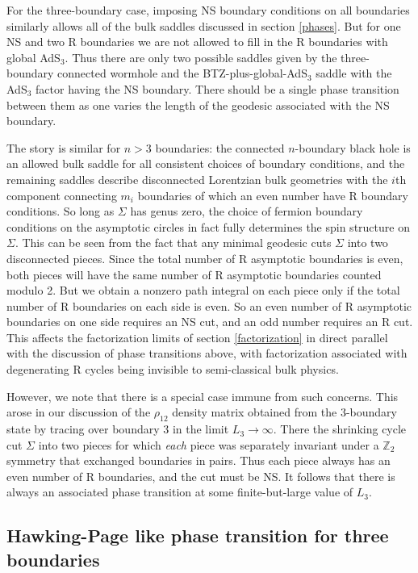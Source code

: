 \documentclass[12pt]{article}
\numberwithin{equation}{section}
\begin{document}
For the three-boundary case, imposing NS boundary conditions on all boundaries similarly allows all of the bulk saddles discussed in section \ref{phases}. But for one NS and two R boundaries we are not allowed to fill in the R boundaries with global AdS${}_3$.  Thus there are only two possible saddles given by the  three-boundary connected wormhole and the BTZ-plus-global-AdS${}_3$ saddle with the AdS${}_3$ factor having the NS boundary.  There should be a single phase transition between them as one varies the length of the geodesic associated with the NS boundary.

The story is similar for $n > 3$ boundaries: the connected $n$-boundary black hole is an allowed bulk saddle for all consistent choices of boundary conditions, and the remaining saddles describe disconnected Lorentzian bulk geometries with the $i$th component connecting $m_i$ boundaries of which an even number have R boundary conditions.  So long as $\Sigma$ has genus zero, the choice of fermion boundary conditions on the asymptotic circles in fact fully determines the spin structure on $\Sigma$.  This can be seen from the fact that any minimal geodesic cuts $\Sigma$ into two disconnected pieces.  Since the total number of R asymptotic boundaries is even, both pieces will have the same number of R asymptotic boundaries counted modulo 2. But we obtain a nonzero path integral on each piece only if the total number of R boundaries on each side is even.  So an even number of R asymptotic boundaries on one side requires an NS cut, and an odd number requires an R cut.  This affects the factorization limits of section \ref{factorization} in direct parallel with the discussion of phase transitions above, with factorization associated with degenerating R cycles being invisible to semi-classical bulk physics.

However, we note that there is a special case immune from such concerns. This arose in our discussion of the $\rho_{12}$ density matrix obtained from the 3-boundary state by tracing over boundary $3$ in the limit $L_3 \rightarrow \infty$.  There the shrinking cycle cut $\Sigma$ into two pieces for which {\em each} piece was separately invariant under a $\mathbb{Z}_2$ symmetry that exchanged boundaries in pairs.  Thus each piece always has an even number of R boundaries, and the cut must be NS.  It follows that there is always an associated phase transition at some finite-but-large value of $L_3$.

\subsection{Hawking-Page like phase transition for three boundaries}
\label{hp}
\end{document}
